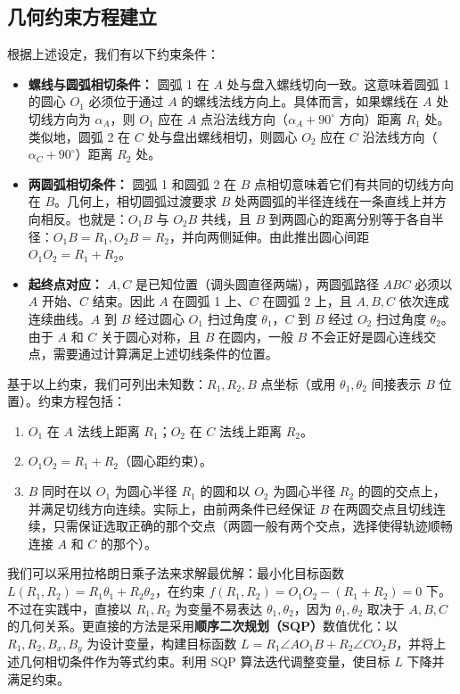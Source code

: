 \documentclass[UTF8]{ctexart}
\begin{document}
\subsection{几何约束方程建立}
根据上述设定，我们有以下约束条件：
\begin{itemize}
    \item \textbf{螺线与圆弧相切条件：} 圆弧 1 在 $A$ 处与盘入螺线切向一致。这意味着圆弧 1 的圆心 $O_1$ 必须位于通过 $A$ 的螺线法线方向上。具体而言，如果螺线在 $A$ 处切线方向为 $\alpha_A$，则 $O_1$ 应在 $A$ 点沿法线方向（$\alpha_A+90^\circ$ 方向）距离 $R_1$ 处。类似地，圆弧 2 在 $C$ 处与盘出螺线相切，则圆心 $O_2$ 应在 $C$ 沿法线方向（$\alpha_C+90^\circ$）距离 $R_2$ 处。
    \item \textbf{两圆弧相切条件：} 圆弧 1 和圆弧 2 在 $B$ 点相切意味着它们有共同的切线方向在 $B$。几何上，相切圆弧过渡要求 $B$ 处两圆弧的半径连线在一条直线上并方向相反。也就是：$O_1B$ 与 $O_2B$ 共线，且 $B$ 到两圆心的距离分别等于各自半径：$O_1B = R_1, O_2B = R_2$，并向两侧延伸。由此推出圆心间距 $O_1O_2 = R_1 + R_2$。
    \item \textbf{起终点对应：} $A, C$ 是已知位置（调头圆直径两端），两圆弧路径 $ABC$ 必须以 $A$ 开始、$C$ 结束。因此 $A$ 在圆弧 1 上、$C$ 在圆弧 2 上，且 $A,B,C$ 依次连成连续曲线。$A$ 到 $B$ 经过圆心 $O_1$ 扫过角度 $\theta_1$，$C$ 到 $B$ 经过 $O_2$ 扫过角度 $\theta_2$。由于 $A$ 和 $C$ 关于圆心对称，且 $B$ 在圆内，一般 $B$ 不会正好是圆心连线交点，需要通过计算满足上述切线条件的位置。
\end{itemize}
基于以上约束，我们可列出未知数：$R_1, R_2, B$ 点坐标（或用 $\theta_1,\theta_2$ 间接表示 $B$ 位置）。约束方程包括：
\begin{enumerate}
    \item $O_1$ 在 $A$ 法线上距离 $R_1$；$O_2$ 在 $C$ 法线上距离 $R_2$。
    \item $O_1O_2 = R_1 + R_2$（圆心距约束）。
    \item $B$ 同时在以 $O_1$ 为圆心半径 $R_1$ 的圆和以 $O_2$ 为圆心半径 $R_2$ 的圆的交点上，并满足切线方向连续。实际上，由前两条件已经保证 $B$ 在两圆交点且切线连续，只需保证选取正确的那个交点（两圆一般有两个交点，选择使得轨迹顺畅连接 $A$ 和 $C$ 的那个）。
\end{enumerate}
我们可以采用拉格朗日乘子法来求解最优解：最小化目标函数 $L(R_1,R_2)=R_1\theta_1 + R_2\theta_2$，在约束 $f(R_1,R_2)=O_1O_2 - (R_1+R_2)=0$ 下。不过在实践中，直接以 $R_1,R_2$ 为变量不易表达 $\theta_1,\theta_2$，因为 $\theta_1,\theta_2$ 取决于 $A,B,C$ 的几何关系。更直接的方法是采用\textbf{顺序二次规划（SQP）}数值优化：以 $R_1,R_2,B_x,B_y$ 为设计变量，构建目标函数 $L = R_1\angle A O_1 B + R_2\angle C O_2 B$，并将上述几何相切条件作为等式约束。利用 SQP 算法迭代调整变量，使目标 $L$ 下降并满足约束。
\end{document}
